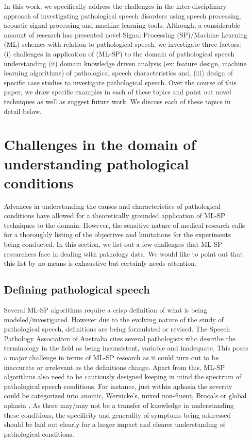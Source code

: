 \documentclass{article}
\begin{document}
In this work, we specifically address the challenges in the inter-disciplinary approach of investigating pathological speech disorders using speech processing, acoustic signal processing and machine learning tools. 
Although, a considerable amount of research has presented novel Signal Processing (SP)/Machine Learning (ML) schemes with relation to pathological speech, we investigate three factors: (i) challenges in application of (ML-SP) to the domain of pathological speech understanding (ii) domain knowledge driven analysis (ex: feature design, machine learning algorithms) of pathological speech characteristics and, (iii) design of specific case studies to investigate pathological speech. 
Over the course of this paper, we draw specific examples in each of these topics and point out novel techniques as well as suggest future work.
We discuss each of these topics in detail below. 

\section{Challenges in the domain of understanding pathological conditions}
Advances in understanding the causes and characteristics of pathological conditions have allowed for a theoretically grounded application of ML-SP techniques to the domain.
However, the sensitive nature of medical research calls for a thoroughly listing of the objectives and limitations for the experiments being conducted.
In this section, we list out a few challenges that ML-SP researchers face in dealing with pathology data.
We would like to point out that this list by no means is exhaustive but certainly needs attention.

\subsection{Defining pathological speech}
Several ML-SP algorithms require a crisp definition of what is being modeled/investigated.
However due to the evolving nature of the study of pathological speech, definitions are being formulated or revised. 
The Speech Pathology Association of Australia \cite{australia2009criteria} cites several pathologists who describe the terminology in the field as being inconsistent, variable and inadequate. 
This poses a major challenge in terms of ML-SP research as it could turn out to be inaccurate or irrelevant as the definitions change.
Apart from this, ML-SP algorithms also need to be cautiously designed keeping in mind the spectrum of pathological speech conditions.
For instance, just within aphasia the severity could be categorized into anomic, Wernicke's, mixed non-fluent, Broca's or global aphasia \cite{}. 
As there may/may not be a transfer of knowledge in understanding these conditions, the specificity and generality of symptoms being addressed should be laid out clearly for a larger impact and clearer understanding of pathological conditions. 
\end{document}

